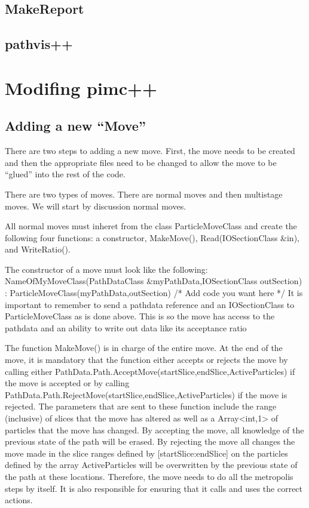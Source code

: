 \documentclass{book}
\begin{document}
\section{MakeReport}
\section{pathvis++}

\chapter{Modifing pimc++}
\section{Adding a new ``Move''}
There are two steps to adding a new move. First, the move needs to be
created and then the appropriate files need to be changed to allow the
move to be ``glued'' into the rest of the code.

There are two types of moves. There are normal moves and then
multistage moves. We will start by discussion normal moves.

All normal moves must inheret from the class ParticleMoveClass and 
create the following four functions: a
constructor, MakeMove(), Read(IOSectionClass &in),  and WriteRatio().

The constructor of a move must look like the following:\\
  NameOfMyMoveClass(PathDataClass &myPathData,IOSectionClass outSection) :
  ParticleMoveClass(myPathData,outSection)
    {
      /* Add code you want here */
    }
It is important to remember to send a pathdata reference and an
  IOSectionClass to ParticleMoveClass as is done above. This is so the
  move has access to the pathdata and an ability to write out data
  like its acceptance ratio

The function MakeMove() is in charge of the entire move.  At the end
of the move, it is mandatory that the function either accepts or
rejects the move by calling either
PathData.Path.AcceptMove(startSlice,endSlice,ActiveParticles) if the
move is accepted or by calling 
PathData.Path.RejectMove(startSlice,endSlice,ActiveParticles) if the
move is rejected.  The parameters that are sent to these function
include the range (inclusive) of slices that the move has altered as
well as a Array<int,1> of particles that the move has changed.  By
accepting the move, all knowledge of the previous state of the path
will be erased. By rejecting the move all changes the move made in the
slice ranges defined by [startSlice:endSlice] on the particles defined
by the array ActiveParticles will be overwritten by the previous state
of the path at these locations.  Therefore, the move needs to do all
the metropolis steps by itself. It is also responsible for ensuring
that it calls and uses the correct actions.
\end{document}

